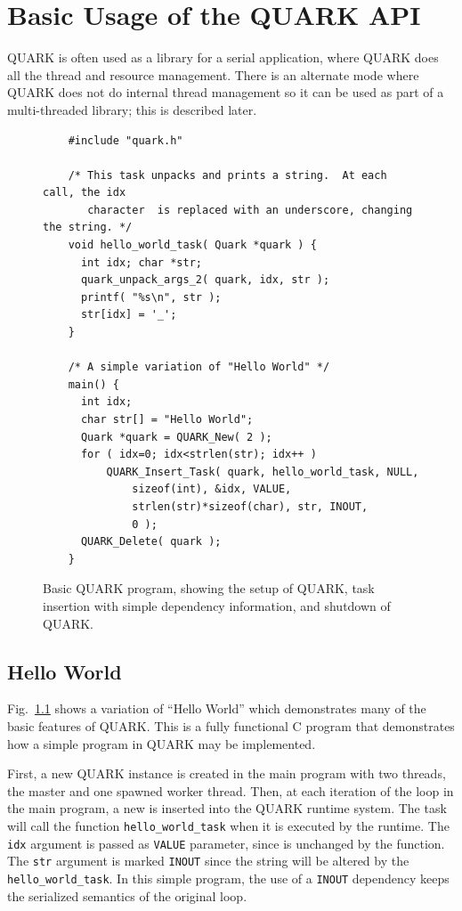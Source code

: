\documentclass[11pt,letterpaper]{report}
\begin{document}

\chapter{Basic Usage of the QUARK API}

QUARK is often used as a library for a serial application, where QUARK
does all the thread and resource management.  There is an alternate
mode where QUARK does not do internal thread management so it can be
used as part of a multi-threaded library; this is described later.

\begin{figure}[bp]
\centering
\begin{lstlisting}
    #include "quark.h"
    
    /* This task unpacks and prints a string.  At each call, the idx
       character  is replaced with an underscore, changing the string. */
    void hello_world_task( Quark *quark ) {
      int idx; char *str;
      quark_unpack_args_2( quark, idx, str );
      printf( "%s\n", str );
      str[idx] = '_';
    }
    
    /* A simple variation of "Hello World" */
    main() {
      int idx;
      char str[] = "Hello World";
      Quark *quark = QUARK_New( 2 );
      for ( idx=0; idx<strlen(str); idx++ )
          QUARK_Insert_Task( quark, hello_world_task, NULL,
              sizeof(int), &idx, VALUE,
              strlen(str)*sizeof(char), str, INOUT,
              0 );
      QUARK_Delete( quark );
    }
\end{lstlisting}
\caption{Basic QUARK program, showing the setup of QUARK, task
  insertion with simple dependency information, and shutdown of
  QUARK. }
\label{fig:quark_basic_example}
\end{figure}

\section{Hello World}  
Fig.~\ref{fig:quark_basic_example} shows a
variation of ``Hello World'' which demonstrates many of the basic
features of QUARK.  This is a fully functional C program that
demonstrates how a simple program in QUARK may be implemented.

First, a new QUARK instance is created in the main program with two
threads, the master and one spawned worker thread.  Then, at each
iteration of the loop in the main program, a new is inserted into the
QUARK runtime system.  The task will call the function
\verb|hello_world_task| when it is executed by the runtime.  The
\verb|idx| argument is passed as \verb|VALUE| parameter, since is
unchanged by the function.  The \verb|str| argument is marked
\verb|INOUT| since the string will be altered by the
\verb|hello_world_task|.  In this simple program, the use of a
\verb|INOUT| dependency keeps the serialized semantics of the original
loop.
\end{document}
